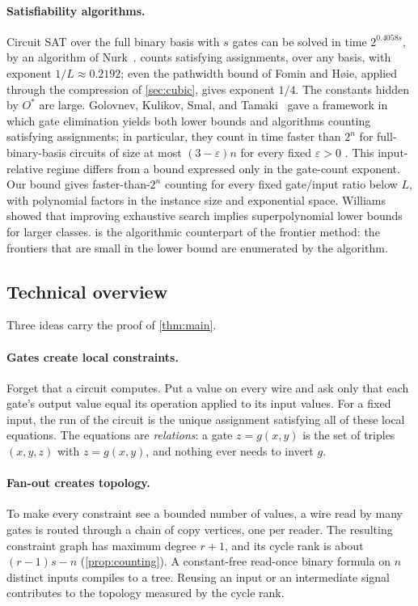 \documentclass[11pt]{article}
\theoremstyle{plain}
\theoremstyle{definition}
\theoremstyle{remark}
\begin{document}
\paragraph{Satisfiability algorithms.}
Circuit SAT over the full binary basis with $s$ gates can be solved in time $2^{0.4058 s}$, by an
algorithm of Nurk~\cite{Nurk2009}.  counts satisfying assignments, over any
basis, with exponent $1/L \approx 0.2192$; even the pathwidth bound of Fomin and H{\o}ie, applied
through the compression of \cref{sec:cubic}, gives exponent $1/4$. The constants hidden by $O^*$
are large. Golovnev, Kulikov, Smal, and Tamaki~\cite{GKST2016} gave a
framework in which gate elimination yields both lower bounds and algorithms counting satisfying
assignments; in particular, they count in time faster than $2^n$ for full-binary-basis circuits
of size at most $(3-\varepsilon)n$ for every fixed $\varepsilon>0$
\cite[Section~5.2, Remark~2]{GKST2016}. This input-relative regime differs from a bound expressed only in the
gate-count exponent. Our bound gives faster-than-$2^n$ counting for every fixed gate/input
ratio below $L$, with polynomial factors in the instance size and exponential space.
Williams~\cite{Williams2013} showed that improving exhaustive search implies
superpolynomial lower bounds for larger classes.  is the algorithmic
counterpart of the frontier method: the frontiers that are small in the lower bound are
enumerated by the algorithm.

\subsection{Technical overview}
\label{sec:overview}

Three ideas carry the proof of \cref{thm:main}.

\paragraph{Gates create local constraints.}
Forget that a circuit computes. Put a value on every wire and ask only that each gate's output
value equal its operation applied to its input values. For a fixed input, the run of the
circuit is the unique assignment satisfying all of these local equations. The equations are
\emph{relations}: a gate $z = g(x,y)$ is the set of triples $(x,y,z)$ with $z = g(x,y)$, and
nothing ever needs to invert $g$.

\paragraph{Fan-out creates topology.}
To make every constraint see a bounded number of values, a wire read by many gates is routed
through a chain of copy vertices, one per reader. The resulting constraint graph has maximum
degree $r+1$, and its cycle rank is about $(r-1)s - n$ (\cref{prop:counting}). A constant-free
read-once binary formula on $n$ distinct inputs compiles to a tree. Reusing an input or an
intermediate signal contributes to the topology measured by the cycle rank.
\end{document}

